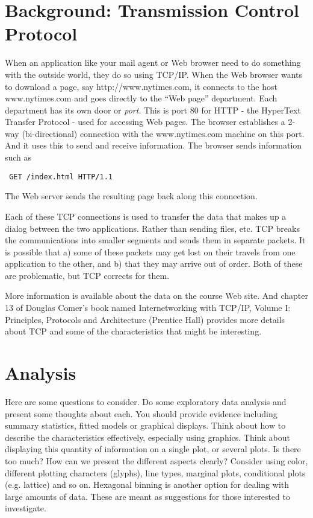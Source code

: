 \documentclass[11pt]{article}
\begin{document}
\section{Background: Transmission Control Protocol}
When an application like your mail agent or Web browser need to do
something with the outside world, they do so using TCP/IP.  When the
Web browser wants to download a page, say http://www.nytimes.com, it
connects to the host www.nytimes.com and goes directly to the ``Web
page'' department. Each department has its own door or \textit{port}.
This is port 80 for HTTP - the HyperText Transfer Protocol - used for
accessing Web pages.  The browser establishes a 2-way (bi-directional)
connection with the www.nytimes.com machine on this port.
And it uses this to send and receive information.  
The browser sends information such as 
\begin{verbatim}
 GET /index.html HTTP/1.1
\end{verbatim}
The Web server sends the resulting page back along this connection.

Each of these TCP connections is used to transfer the data that makes
up a dialog between the two applications.  Rather than sending files,
etc. TCP breaks the communications into smaller segments and sends
them in separate packets.  It is possible that a) some of these
packets may get lost on their travels from one application to the
other, and b) that they may arrive out of order.  Both of these are
problematic, but TCP corrects for them.

More information is available about the data on the course Web site.
And chapter 13 of Douglas Comer's book named Internetworking with
TCP/IP, Volume I: Principles, Protocols and Architecture (Prentice
Hall) provides more details about TCP and some of the characteristics
that might be interesting.


\section{Analysis}

Here are some questions to consider.  Do some exploratory data
analysis and present some thoughts about each.  You should provide
evidence including summary statistics, fitted models or graphical
displays.  Think about how to describe the characteristics
effectively, especially using graphics.  Think about displaying this
quantity of information on a single plot, or several plots.  Is there
too much? How can we present the different aspects clearly?  Consider
using color, different plotting characters (glyphs), line types,
marginal plots, conditional plots (e.g. lattice) and so on.  Hexagonal
binning is another option for dealing with large amounts of data.
These are meant as suggestions for those interested to investigate.
\end{document}

